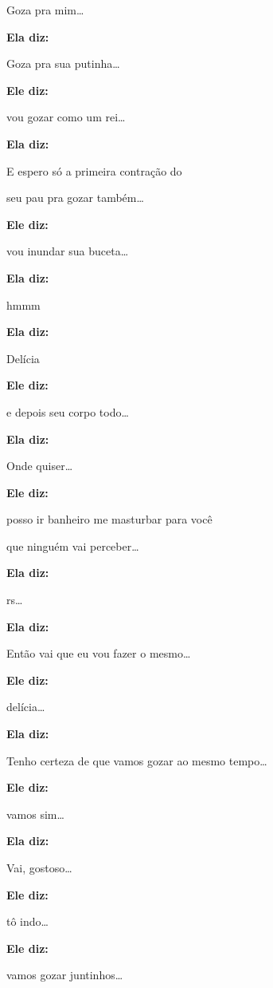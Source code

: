 Goza pra mim…

\textbf{Ela diz:}

Goza pra sua putinha…

\textbf{Ele diz:}

vou gozar como um rei…

\textbf{Ela diz:}

E espero só a primeira contração do

seu pau pra gozar também…

\textbf{Ele diz:}

vou inundar sua buceta…

\textbf{Ela diz:}

hmmm

\textbf{Ela diz:}

Delícia

\textbf{Ele diz:}

e depois seu corpo todo…

\textbf{Ela diz:}

Onde quiser…

\textbf{Ele diz:}

posso ir banheiro me masturbar para você

que ninguém vai perceber…

\textbf{Ela diz:}

rs…

\textbf{Ela diz:}

Então vai que eu vou fazer o mesmo…

\textbf{Ele diz:}

delícia…

\textbf{Ela diz:}

Tenho certeza de que vamos gozar ao mesmo tempo…

\textbf{Ele diz:}

vamos sim…

\textbf{Ela diz:}

Vai, gostoso…

\textbf{Ele diz:}

tô indo…

\textbf{Ele diz:}

vamos gozar juntinhos…


